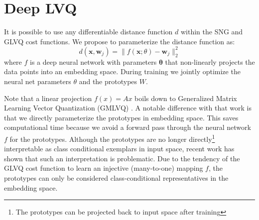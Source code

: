 \documentclass{esannV2}
\begin{document}
\section{Deep LVQ}
It is possible to use any differentiable distance function $d$ within the SNG and GLVQ cost functions. We propose to parameterize the distance function as:
\begin{equation}
 d(\mathbf{x}, \mathbf{w}_j) = \|f(\mathbf{x}; \theta) - \mathbf{w}_j\|^2_2
\end{equation}
where $f$ is a deep neural network with parameters $\mathbf{\theta}$ that non-linearly projects the data points into an embedding space. During training we jointly optimize the neural net parameters $\theta$ and the prototypes $W$. 

Note that a linear projection $f(x) = Ax$ boils down to Generalized Matrix Learning Vector Quantization (GMLVQ) \cite{schneider2009adaptive,bunte2012limited}. A notable difference with that work is that we directly parameterize the prototypes in embedding space. This saves computational time because we avoid a forward pass through the neural network $f$ for the prototypes. Although the prototypes are no longer directly\footnote{The prototypes can be projected back to input space after training} interpretable as class conditional exemplars in input space, recent work\cite{de2013stationarity} has shown that such an interpretation is problematic. Due to the tendency of the GLVQ cost function to learn an injective (many-to-one) mapping $f$, the prototypes can only be considered class-conditional representatives in the embedding space. 
\end{document}
